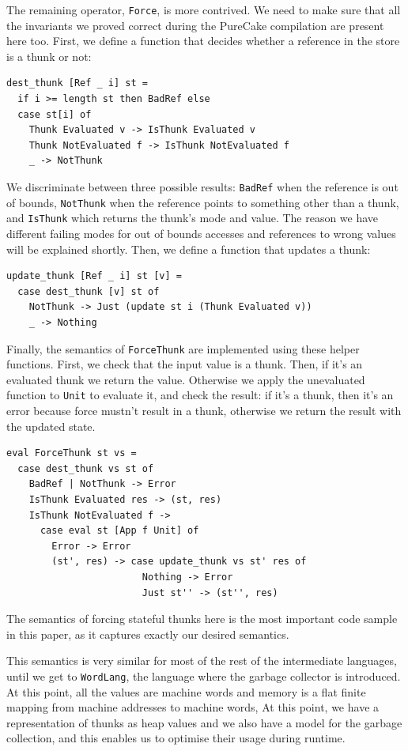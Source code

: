 \documentclass[sigconf]{acmart}
\newcommand{\hsinl}[1]{\texttt{#1}}
\newcommand{\code}[1]{\texttt{#1}}
\newcommand{\WordLang}{\code{WordLang}}
\begin{document}
The remaining operator, \hsinl{Force}, is more contrived. We need to make sure
that all the invariants we proved correct during the PureCake compilation are
present here too. First, we define a function that decides whether a reference
in the store is a thunk or not:
\begin{verbatim}
dest_thunk [Ref _ i] st =
  if i >= length st then BadRef else
  case st[i] of
    Thunk Evaluated v -> IsThunk Evaluated v
    Thunk NotEvaluated f -> IsThunk NotEvaluated f
    _ -> NotThunk
\end{verbatim}
We discriminate between three possible results: \hsinl{BadRef} when the
reference is out of bounds, \hsinl{NotThunk} when the reference points to
something other than a thunk, and \hsinl{IsThunk} which returns the thunk's mode
and value. The reason we have different failing modes for out of bounds accesses
and references to wrong values will be explained shortly. Then, we define a
function that updates a thunk:
\begin{verbatim}
update_thunk [Ref _ i] st [v] =
  case dest_thunk [v] st of
    NotThunk -> Just (update st i (Thunk Evaluated v))
    _ -> Nothing
\end{verbatim}
Finally, the semantics of \hsinl{ForceThunk} are implemented using these helper
functions. First, we check that the input value is a thunk. Then, if it's an
evaluated thunk we return the value. Otherwise we apply the unevaluated function
to \hsinl{Unit} to evaluate it, and check the result: if it's a thunk, then it's
an error because force mustn't result in a thunk, otherwise we return the result
with the updated state.
\begin{verbatim}
eval ForceThunk st vs =
  case dest_thunk vs st of
    BadRef | NotThunk -> Error
    IsThunk Evaluated res -> (st, res)
    IsThunk NotEvaluated f ->
      case eval st [App f Unit] of
        Error -> Error
        (st', res) -> case update_thunk vs st' res of
                        Nothing -> Error
                        Just st'' -> (st'', res)
\end{verbatim}
The semantics of forcing stateful thunks here is the most important code sample
in this paper, as it captures exactly our desired semantics.

This semantics is very similar for most of the rest of the intermediate
languages, until we get to \WordLang{}, the language where the garbage collector
is introduced. At this point, all the values are machine words and memory is a
flat finite mapping from machine addresses to machine words, At this point, we
have a representation of thunks as heap values and we also have a model for the
garbage collection, and this enables us to optimise their usage during runtime.
\end{document}

